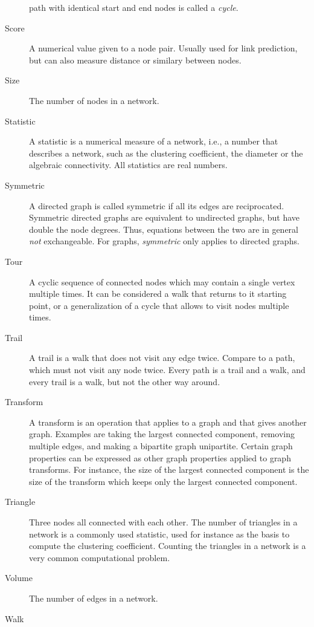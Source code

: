 \documentclass{article}
\begin{document}
\begin{description}
    path with identical start and end nodes is called a \emph{cycle}. 
  \item[Score]
    A numerical value given to a node pair.  Usually used for link
    prediction, but can also measure distance or similary between
    nodes. 
  \item[Size]
    The number of nodes in a network.  
  \item[Statistic]
    A statistic is a numerical measure of a network, i.e., a number that
    describes a network, such as the clustering coefficient, the
    diameter or the algebraic connectivity.  All statistics are real
    numbers.   
  \item[Symmetric] A directed graph is called symmetric if all its edges
    are reciprocated.  Symmetric directed graphs are equivalent to
    undirected graphs, but have double the node degrees.  Thus,
    equations between the two are in general \emph{not} exchangeable.
    For graphs, \emph{symmetric} only applies to directed graphs. 
  \item[Tour]
    A cyclic sequence of connected nodes which may contain a single
    vertex multiple times.  It can be considered a walk that returns to
    it starting point, or a generalization of a cycle that allows to
    visit nodes multiple times.  
  \item[Trail] A trail is a walk that does not visit any edge twice.
    Compare to a path, which must not visit any node twice.  Every path
    is a trail and a walk, and every trail is a walk, but not the other
    way around. 
  \item[Transform] 
    A transform is an operation that applies to a graph and that gives
    another graph.  Examples are taking the largest connected component,
    removing multiple edges, and making a bipartite graph unipartite.
    Certain graph properties can be expressed as other graph properties
    applied to graph transforms.  For instance, the size of the largest
    connected component is the size of the transform which keeps only
    the largest connected component. 
  \item[Triangle]
    Three nodes all connected with each other.  The number of triangles
    in a network is a commonly used statistic, used for instance as
    the basis to compute the clustering coefficient.  Counting the
    triangles in a network is a very common computational problem.  
  \item[Volume]
    The number of edges in a network.  
  \item[Walk]

\end{description}
\end{document}
